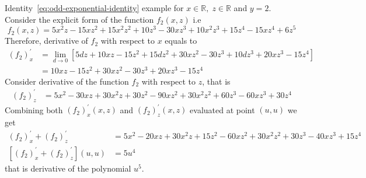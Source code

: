 \begin{example}
    \normalfont
    Identity~\eqref{eq:odd-exponential-identity} example for $x\in\mathbb{R}, \; z\in \mathbb{R}$ and $y=2$.
    Consider the explicit form of the function $f_{2} (x, z)$ i.e
    \[
        f_2 (x, z) = 5 x^2 z - 15 x z^2 + 15 x^2 z^2 + 10 z^3 - 30 x z^3 + 10 x^2 z^3 + 15 z^4 - 15 x z^4 + 6 z^5
    \]
    Therefore, derivative of $f_{2}$ with respect to $x$ equals to
    \begin{align*}
    (f_2)
        ^{'}_{x} &= \lim_{d \to 0} \left[ 5 d z + 10 x z - 15 z^2 + 15 d z^2 + 30 x z^2 - 30 z^3 + 10 d z^3 +
        20 x z^3 - 15 z^4 \right] \\
        &= 10 x z - 15 z^2 + 30 x z^2 - 30 z^3 + 20 x z^3 - 15 z^4
    \end{align*}
    Consider derivative of the function $f_2$ with respect to $z$, that is
    \begin{align*}
    (f_2)
        ^{'}_{z}
        &= 5 x^2 - 30 x z + 30 x^2 z + 30 z^2 - 90 x z^2 + 30 x^2 z^2 + 60 z^3 - 60 x z^3 + 30 z^4
    \end{align*}
    Combining both $(f_2)^{'}_{x} (x, z)$ and $(f_2)^{'}_{z} (x, z)$ evaluated at point $(u, u)$ we get
    \begin{align*}
    (f_2)
        ^{'}_{x} + (f_2)^{'}_{z} &= 5 x^2 - 20 x z + 30 x^2 z + 15 z^2 - 60 x z^2 + 30 x^2 z^2 + 30 z^3 - 40 x z^3 + 15 z^4\\
        [(f_2)^{'}_{x} + (f_2)^{'}_{z}] (u,u) &= 5 u^4
    \end{align*}
    that is derivative of the polynomial $u^5$.
\end{example}
